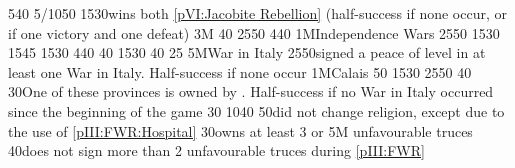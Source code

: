 {5}{40}{}%
%
%
%
{5/10}{50}{}%
%
%
{15}{30}{\paysmajeurAngleterre wins both \ref{pVI:Jacobite Rebellion}
  (half-success if none occur, or if one victory and one defeat)}%
%
\EUobjective3M{}{}%
{}{40}{}%
%
%
{25}{50}{\EU@objWoSS}%
%
%
{4}{40}{\EU@objEastIndiesConvoy}%
%
%
\EUobjective1M{Independence Wars}{}%
{25}{50}{\EU@objIndependanceWars}%
%
%
{15}{30}{\EU@objFranceContained}%
%
%
{15}{45}{\EU@objEachCC}%
%
%
{15}{30}{\EU@objSYW}
%
%
{4}{40}{\EU@objEastIndiesConvoy}%
%
%
%
 
%
%
{}{40}{\EU@objCalaisFRA}%
%
%
%
{15}{30}{}%
%
%
{}{40}{\EU@objSDCF}%
%
%
{}{25}{\EU@objIndustrial}%
%
%
\EUobjective5M{War in Italy}{}%
{25}{50}{\paysmajeurFrance signed a peace of level  in at least one War
  in Italy. Half-success if none occur}%
%
%
\EUobjective1M{Calais}{}%
{}{50}{\EU@objCalaisFRA}%
%
%
{15}{30}{}%
%
%
{25}{50}{}%
%
%
{}{40}{\EU@objIndustrial}%
%
%
{}{30}{One of these provinces is owned by \paysmajeurFrance. Half-success if
  no War in Italy occurred since the beginning of the game}%
%
%
%
{}{30}{}%
%
%
%
{10}{40}{}%
%
%
{}{50}{\paysmajeurFrance did not change religion, except due to the use of
  \ref{pIII:FWR:Hospital}}%
%
%
%
{}{30}{\paysmajeurFrance owns at least 3 \COL or \TP}%
%
%
\EUobjective5M{ unfavourable truces}{}%
{}{40}{\paysmajeurFrance does not sign more than 2 unfavourable truces during
  \ref{pIII:FWR}}%
